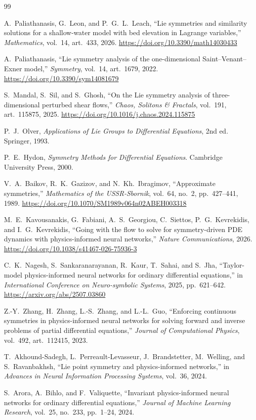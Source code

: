\documentclass[11pt]{article}
\begin{document}
\footnotesize
\begin{thebibliography}{99}
\setlength{\itemsep}{1pt}

A.~Paliathanasis, G.~Leon, and P.~G.~L.~Leach,
``Lie symmetries and similarity solutions for a shallow-water model with bed elevation in Lagrange variables,''
\emph{Mathematics}, vol.~14, art.~433, 2026.
\url{https://doi.org/10.3390/math14030433}

A.~Paliathanasis,
``Lie symmetry analysis of the one-dimensional Saint--Venant--Exner model,''
\emph{Symmetry}, vol.~14, art.~1679, 2022.
\url{https://doi.org/10.3390/sym14081679}

S.~Mandal, S.~Sil, and S.~Ghosh,
``On the Lie symmetry analysis of three-dimensional perturbed shear flows,''
\emph{Chaos, Solitons \& Fractals}, vol.~191, art.~115875, 2025.
\url{https://doi.org/10.1016/j.chaos.2024.115875}

P.~J.~Olver,
\emph{Applications of Lie Groups to Differential Equations}, 2nd ed.
Springer, 1993.

P.~E.~Hydon,
\emph{Symmetry Methods for Differential Equations}.
Cambridge University Press, 2000.

V.~A.~Baikov, R.~K.~Gazizov, and N.~Kh.~Ibragimov,
``Approximate symmetries,''
\emph{Mathematics of the USSR-Sbornik}, vol.~64, no.~2, pp.~427--441, 1989.
\url{https://doi.org/10.1070/SM1989v064n02ABEH003318}

M.~E.~Kavousanakis, G.~Fabiani, A.~S.~Georgiou, C.~Siettos,
P.~G.~Kevrekidis, and I.~G.~Kevrekidis,
``Going with the flow to solve for symmetry-driven PDE dynamics with physics-informed neural networks,''
\emph{Nature Communications}, 2026.
\url{https://doi.org/10.1038/s41467-026-75936-3}

C.~K.~Nagesh, S.~Sankaranarayanan, R.~Kaur, T.~Sahai, and S.~Jha,
``Taylor-model physics-informed neural networks for ordinary differential equations,''
in \emph{International Conference on Neuro-symbolic Systems}, 2025, pp.~621--642.
\url{https://arxiv.org/abs/2507.03860}

Z.-Y.~Zhang, H.~Zhang, L.-S.~Zhang, and L.-L.~Guo,
``Enforcing continuous symmetries in physics-informed neural networks for solving forward and inverse problems of partial differential equations,''
\emph{Journal of Computational Physics}, vol.~492, art.~112415, 2023.

T.~Akhound-Sadegh, L.~Perreault-Levasseur, J.~Brandstetter,
M.~Welling, and S.~Ravanbakhsh,
``Lie point symmetry and physics-informed networks,''
in \emph{Advances in Neural Information Processing Systems}, vol.~36, 2024.

S.~Arora, A.~Bihlo, and F.~Valiquette,
``Invariant physics-informed neural networks for ordinary differential equations,''
\emph{Journal of Machine Learning Research}, vol.~25, no.~233, pp.~1--24, 2024.

\end{thebibliography}
\end{document}
